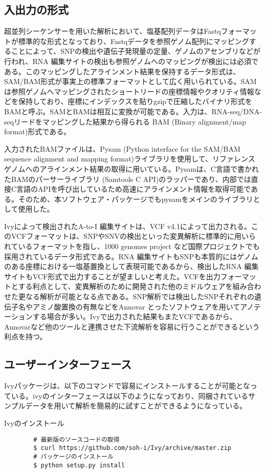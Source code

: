 \subsection{入出力の形式}
超並列シーケンサーを用いた解析において、塩基配列データはFastqフォーマットが標準的な形式となっており、Fastqデータを参照ゲノム配列にマッピングすることによって、SNPの検出や遺伝子発現量の定量、ゲノムのアセンブリなどが行われ、RNA 編集サイトの検出も参照ゲノムへのマッピングが検出には必須である。このマッピングしたアラインメント結果を保持するデータ形式は、SAM/BAM形式が事実上の標準フォーマットとして広く用いられている。SAMは参照ゲノムへマッピングされたショートリードの座標情報やクオリティ情報などを保持しており、座標にインデックスを貼りgzipで圧縮したバイナリ形式をBAMと呼ぶ。SAMとBAMは相互に変換が可能である。入力は、RNA-seq/DNA-seqリードをマッピングした結果から得られる BAM (Binary alignment/map format)形式である。
\par
入力されたBAMファイルは、Pysam (Python interface for the SAM/BAM sequence alignment and mapping format)ライブラリを使用して、リファレンスゲノムへのアラインメント結果の取得に用いている。Pysamは、C言語で書かれたBAMのパーサーライブラリ (Samtools C API)のラッパーであり、内部では直接C言語のAPIを呼び出しているため高速にアラインメント情報を取得可能である。そのため、本ソフトウェア・パッケージでもpysamをメインのライブラリとして使用した。
\par
Ivyによって検出されたA-to-I 編集サイトは、VCF v4.1によって出力される。このVCFフォーマットは、SNPやSNVの検出といった変異解析に標準的に用いられているフォーマットを指し、1000 genomes project など国際プロジェクトでも採用されているデータ形式である。RNA 編集サイトもSNPも本質的にはゲノムのある座標における一塩基置換として表現可能であるから、検出したRNA 編集サイトもVCF形式で出力することが望ましいと考えた。VCFを出力フォーマットとする利点として、変異解析のために開発された他のミドルウェアを組み合わせた更なる解析が可能となる点である。SNP解析では検出したSNPそれぞれの遺伝子名やアミノ酸置換の有無などをAnnovar \citep{Wang:2010aa}とったソフトウェアを用いてアノテーションする場合が多い。Ivyで出力された結果もまたVCFであるから、Annovarなど他のツールと連携させた下流解析を容易に行うことができるという利点を持つ。

\subsection{ユーザーインターフェース}
Ivyパッケージは、以下のコマンドで容易にインストールすることが可能となっている。ivyのインターフェースは以下のようになっており、同梱されているサンプルデータを用いて解析を簡易的に試すことができるようになっている。
\begin{itembox}[l]{Ivyのインストール}
	\begin{verbatim}
		# 最新版のソースコードの取得
		$ curl https://github.com/soh-i/Ivy/archive/master.zip
		# パッケージのインストール
		$ python setup.py install
	\end{verbatim}
\end{itembox}

